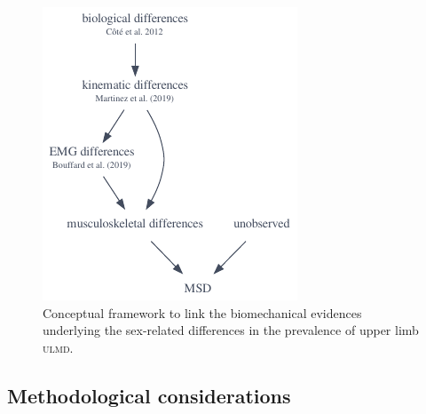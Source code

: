 \begin{figure}[H]
    \centering\includegraphics[width=0.5\linewidth]{fig/links.pdf}
    \caption{Conceptual framework to link the biomechanical evidences underlying the sex-related differences in the prevalence of upper limb \textsc{ulmd}.}
    \label{fig:links}
\end{figure}

\subsection{Methodological considerations}\label{subsec:methodological-considerations}

